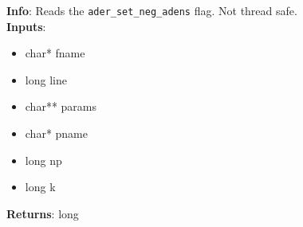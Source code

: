 \textbf{Info}: Reads the \verb|ader_set_neg_adens| flag. Not thread safe. \\

\noindent \textbf{Inputs}:
\begin{itemize}
\item{char* fname}
\item{long line}
\item{char** params}
\item{char* pname}
\item{long np}
\item{long k}
\end{itemize}

\noindent \textbf{Returns}: long
